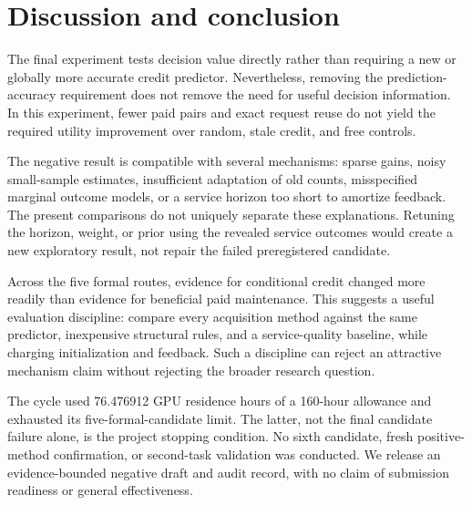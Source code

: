 \section{Discussion and conclusion}
The final experiment tests decision value directly rather than requiring
a new or globally more accurate credit predictor. Nevertheless, removing
the prediction-accuracy requirement does not remove the need for useful
decision information. In this experiment, fewer paid pairs and exact
request reuse do not yield the required utility improvement over random,
stale credit, and free controls.

The negative result is compatible with several mechanisms: sparse gains,
noisy small-sample estimates, insufficient adaptation of old counts,
misspecified marginal outcome models, or a service horizon too short to
amortize feedback. The present comparisons do not uniquely separate these
explanations. Retuning the horizon, weight, or prior using the revealed
service outcomes would create a new exploratory result, not repair the
failed preregistered candidate.

Across the five formal routes, evidence for conditional credit changed
more readily than evidence for beneficial paid maintenance. This suggests
a useful evaluation discipline: compare every acquisition method against
the same predictor, inexpensive structural rules, and a service-quality
baseline, while charging initialization and feedback. Such a discipline
can reject an attractive mechanism claim without rejecting the broader
research question.

The cycle used 76.476912 GPU residence hours of a 160-hour allowance and
exhausted its five-formal-candidate limit. The latter, not the final
candidate failure alone, is the project stopping condition. No sixth
candidate, fresh positive-method confirmation, or second-task validation
was conducted. We release an evidence-bounded negative draft and audit
record, with no claim of submission readiness or general effectiveness.
